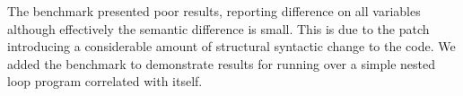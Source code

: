 %
%
%

The  benchmark presented poor results, reporting difference on all variables although effectively the semantic difference is small. This is due to the patch introducing a considerable amount of structural syntactic change to the code. We added the  benchmark to demonstrate results for running over a simple nested loop program correlated with itself.
